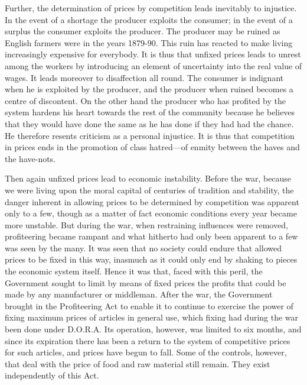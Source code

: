 \documentclass{book}
\begin{document}
Further, the determination of prices by competition leads inevitably to injustice. In the event of a shortage the producer exploits the consumer; in the event of a surplus the consumer exploits the producer. The producer may be ruined as English farmers were in the years 1879-90. This ruin has reacted to make living increasingly expensive for everybody. It is thus that unfixed prices leads to unrest among the workers by introducing an element of uncertainty into the real value of wages. It leads moreover to disaffection all round. The consumer is indignant when he is exploited by the producer, and the producer when ruined becomes a centre of discontent. On the other hand the producer who has profited by the system hardens his heart towards the rest of the community because he believes that they would have done the same as he has done if they had had the chance. He therefore resents criticism as a personal injustice. It is thus that competition in prices ends in the promotion of class hatred—of enmity between the haves and the have-nots.

Then again unfixed prices lead to economic instability. Before the war, because we were living upon the moral capital of centuries of tradition and stability, the danger inherent in allowing prices to be determined by competition was apparent only to a few, though as a matter of fact economic conditions every year became more unstable. But during the war, when restraining influences were removed, profiteering became rampant and what hitherto had only been apparent to a few was seen by the many. It was seen that no society could endure that allowed prices to be fixed in this way, inasmuch as it could only end by shaking to pieces the economic system itself. Hence it was that, faced with this peril, the Government sought to limit by means of fixed prices the profits that could be made by any manufacturer or middleman. After the war, the Government brought in the Profiteering Act to enable it to continue to exercise the power of fixing maximum prices of articles in general use, which fixing had during the war been done under D.O.R.A. Its operation, however, was limited to six months, and since its expiration there has been a return to the system of competitive prices for such articles, and prices have begun to fall. Some of the controls, however, that deal with the price of food and raw material still remain. They exist independently of this Act.
\end{document}
